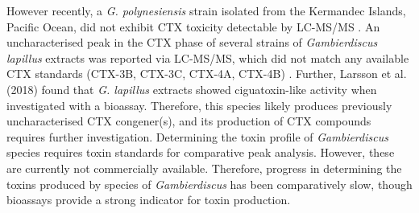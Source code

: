 \documentclass[12pt]{article}
\begin{document}
However recently, a \emph{G. polynesiensis} strain isolated from the Kermandec Islands, Pacific Ocean, did not exhibit CTX toxicity detectable by LC-MS/MS  \citep{rhodes2017epiphytic}.
An uncharacterised peak in the CTX phase of several strains of \emph{Gambierdiscus lapillus} extracts was reported via LC-MS/MS, which did not match any available CTX standards (CTX-3B, CTX-3C, CTX-4A, CTX-4B) \citep{kretzschmar2017characterization}. 
Further, Larsson et al. (2018) found that \emph{G. lapillus} extracts showed ciguatoxin-like activity when investigated with a bioassay. 
Therefore, this species likely produces previously uncharacterised CTX congener(s), and its production of CTX compounds requires further investigation.
Determining the toxin profile of \textit{Gambierdiscus} species requires toxin standards for comparative peak analysis. 
However, these are currently not commercially available. 
Therefore, progress in determining the toxins produced by species of \emph{Gambierdiscus} has been comparatively slow, though bioassays provide a strong indicator for toxin production.\\

\end{document}
